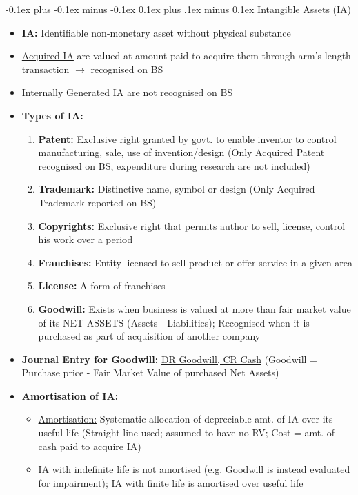 \documentclass[landscape]{article}
\makeatletter
\renewcommand{\subsection}{\@startsection{subsection}{2}{0mm}%
  {-0.1ex plus -0.1ex minus -0.1ex}%
  {0.1ex plus .1ex minus 0.1ex}%
{\normalfont\scriptsize\bfseries}}
\makeatother
\begin{document}
\begin{multicols}{6}
    \subsection{Intangible Assets (IA)}
    \begin{itemize}
      \item \textbf{IA:} Identifiable non-monetary asset without physical substance
      \item \underline{Acquired IA} are valued at amount paid to acquire them through arm's length transaction $\rightarrow$ recognised on BS
      \item \underline{Internally Generated IA} are not recognised on BS
      \item \textbf{Types of IA:}
      \begin{enumerate}
        \item \textbf{Patent:} Exclusive right granted by govt. to enable inventor to control manufacturing, sale, use of invention/design (Only Acquired Patent recognised on BS, expenditure during research are not included)
        \item \textbf{Trademark:} Distinctive name, symbol or design (Only Acquired Trademark reported on BS)
        \item \textbf{Copyrights:} Exclusive right that permits author to sell, license, control his work over a period
        \item \textbf{Franchises:} Entity licensed to sell product or offer service in a given area
        \item \textbf{License:} A form of franchises
        \item \textbf{Goodwill:} Exists when business is valued at more than fair market value of its NET ASSETS (Assets - Liabilities); Recognised when it is purchased as part of acquisition of another company
      \end{enumerate}
      \item \textbf{Journal Entry for Goodwill:} \underline{DR Goodwill, CR Cash} (Goodwill = Purchase price - Fair Market Value of purchased Net Assets)
      \item \textbf{Amortisation of IA:}
      \begin{itemize}
        \item \underline{Amortisation:} Systematic allocation  of depreciable amt. of IA over its useful life (Straight-line used; assumed to have no RV; Cost = amt. of cash paid to acquire IA)
        \item IA with indefinite life is not amortised (e.g. Goodwill is instead evaluated for impairment); IA with finite life is amortised over useful life

\end{itemize}
\end{itemize}
\end{multicols}
\end{document}
